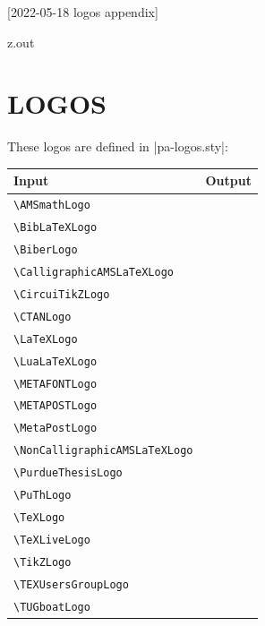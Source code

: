 [2022-05-18 logos appendix]

\begin{VerbatimOut}{z.out}
\chapter{LOGOS}

These logos are defined in |pa-logos.sty|:

\noindent
\begin{tabular}{@{}ll@{}}
  \toprule
  \bfseries Input& \bfseries Output\\
  \midrule
  \verb+\AMSmathLogo+& \AMSmathLogo\\[2pt]
  \verb+\BibLaTeXLogo+& \BibLaTeXLogo\\[2pt]
  \verb+\BiberLogo+& \BiberLogo\\[2pt]
  \verb+\CalligraphicAMSLaTeXLogo+& \CalligraphicAMSLaTeXLogo\\[2pt]
  \verb+\CircuiTikZLogo+& \CircuiTikZLogo\\[2pt]
  \verb+\CTANLogo+& \CTANLogo\\[2pt]
  \verb+\LaTeXLogo+& \LaTeXLogo\\[2pt]
  \verb+\LuaLaTeXLogo+& \LuaLaTeXLogo\\[2pt]
  \verb+\METAFONTLogo+& \METAFONTLogo\\[2pt]
  \verb+\METAPOSTLogo+& \METAPOSTLogo\\[2pt]
  \verb+\MetaPostLogo+& \MetaPostLogo\\[2pt]
  \verb+\NonCalligraphicAMSLaTeXLogo+& \NonCalligraphicAMSLaTeXLogo\\[2pt]
  \verb+\PurdueThesisLogo+& \PurdueThesisLogo\\[2pt]
  \verb+\PuThLogo+& \PuThLogo\\[2pt]
  \verb+\TeXLogo+& \TeXLogo\\[2pt]
  \verb+\TeXLiveLogo+& \TeXLiveLogo\\[2pt]
  \verb+\TikZLogo+& \TikZLogo\\[2pt]
  \verb+\TEXUsersGroupLogo+& \TeXUsersGroupLogo\\[2pt]
  \verb+\TUGboatLogo+& \TUGboatLogo\\[2pt]
  \bottomrule
\end{tabular}
\end{VerbatimOut}

\MyIO
